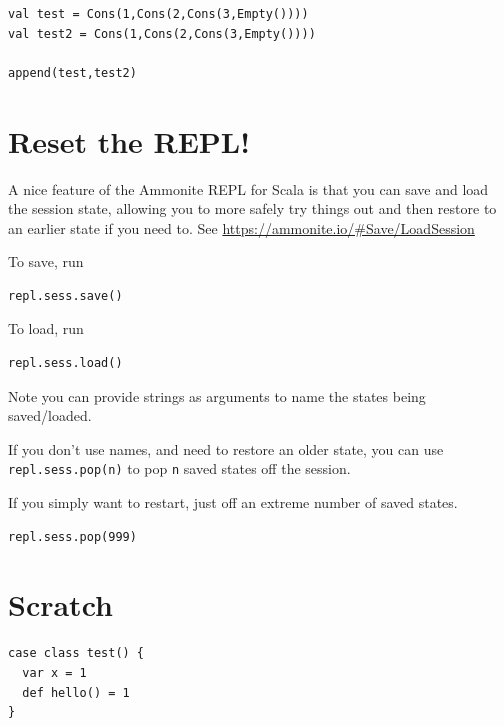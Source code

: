 \documentclass[11pt]{article}
\begin{document}
\begin{verbatim}
val test = Cons(1,Cons(2,Cons(3,Empty())))
val test2 = Cons(1,Cons(2,Cons(3,Empty())))

append(test,test2)
\end{verbatim}

\section{Reset the REPL!}
\label{sec:org5b179d5}
A nice feature of the Ammonite REPL for Scala
is that you can save and load the session state,
allowing you to more safely try things out
and then restore to an earlier state if you need to.
See \url{https://ammonite.io/\#Save/LoadSession}

To save, run
\begin{verbatim}
repl.sess.save()
\end{verbatim}

To load, run
\begin{verbatim}
repl.sess.load()
\end{verbatim}

Note you can provide strings as arguments to name the states
being saved/loaded.

If you don't use names, and need to restore an older state,
you can use \texttt{repl.sess.pop(n)} to pop \texttt{n} saved states off the session.

If you simply want to restart, just off an extreme number
of saved states.
\begin{verbatim}
repl.sess.pop(999)
\end{verbatim}

\section{Scratch}
\label{sec:orgcb5c03e}
\begin{verbatim}
case class test() {
  var x = 1
  def hello() = 1
}
\end{verbatim}
\end{document}
